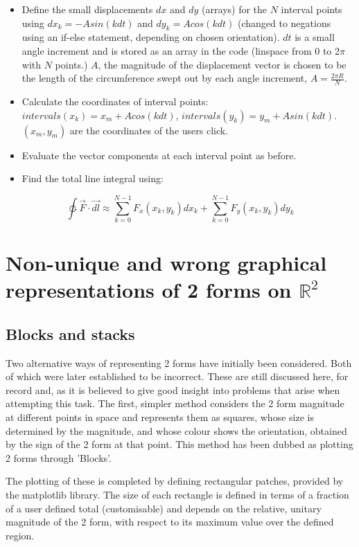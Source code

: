 \documentclass[11]{report}
\begin{document}
\begin{itemize}
	\item Define the small displacements $dx$ and $dy$ (arrays) for the $N$ interval points using $dx_k = -Asin(kdt)$ and $dy_k = Acos(kdt)$ (changed to negations using an if-else statement, depending on chosen orientation). $dt$ is a small angle increment and is stored as an array in the code (linspace from 0 to 2$\pi$ with $N$ points.) $A$, the magnitude of the displacement vector is chosen to be the length of the circumference swept out by each angle increment, $A = \frac{2\pi R}{N}$. 
	\item Calculate the coordinates of interval points: $intervals(x_k) = x_m + Acos(kdt)$, $intervals(y_k) = y_m + Asin(kdt)$. $(x_m,y_m)$ are the coordinates of the users click. 
	\item Evaluate the vector components at each interval point as before.
	\item Find the total line integral using:
\end{itemize}

\begin{equation}
	\ointctrclockwise \vec{F} \cdot \vec{dl} \approx \sum_{k=0}^{N-1} F_x(x_k,y_k)dx_k + \sum_{k=0}^{N-1} F_y(x_k,y_k)dy_k
\end{equation}



\section{Non-unique and wrong graphical representations of 2 forms on $\mathbb{R}^{2}$}
\subsection{Blocks and stacks}
Two alternative ways of representing 2 forms have initially been considered. Both of which were later established to be incorrect. These are still discussed here, for record and, as it is believed to give good insight into problems that arise when attempting this task. 
The first, simpler method considers the 2 form magnitude at different points in space and represents them as squares, whose size is determined by the magnitude, and whose colour shows the orientation, obtained by the sign of the 2 form at that point. This method has been dubbed as plotting 2 forms through 'Blocks'.

\noindent The plotting of these is completed by defining rectangular patches, provided by the matplotlib library. The size of each rectangle is defined in terms of a fraction of a user defined total (customisable) and depends on the relative, unitary magnitude of the 2 form, with respect to its maximum value over the defined region.
\end{document}

